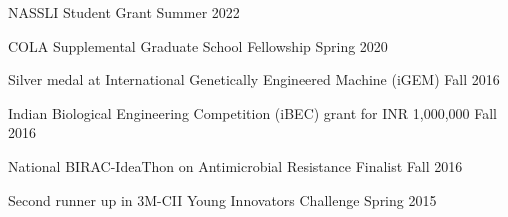 NASSLI Student Grant \hfill Summer 2022

COLA Supplemental Graduate School Fellowship \hfill Spring 2020

Silver medal at International Genetically Engineered Machine (iGEM) \hfill Fall 2016

Indian Biological Engineering Competition (iBEC) grant for INR 1,000,000 \hfill Fall 2016

National BIRAC-IdeaThon on Antimicrobial Resistance Finalist \hfill Fall 2016

Second runner up in 3M-CII Young Innovators Challenge \hfill Spring 2015

